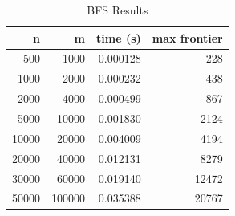 \begin{table}[H]
\centering
\caption{BFS Results}
\begin{tabular}{rrrr}
\toprule
n & m & time (s) & max frontier\\
\midrule
500 & 1000 & 0.000128 & 228\\
1000 & 2000 & 0.000232 & 438\\
2000 & 4000 & 0.000499 & 867\\
5000 & 10000 & 0.001830 & 2124\\
10000 & 20000 & 0.004009 & 4194\\
20000 & 40000 & 0.012131 & 8279\\
30000 & 60000 & 0.019140 & 12472\\
50000 & 100000 & 0.035388 & 20767\\
\bottomrule
\end{tabular}
\end{table}
